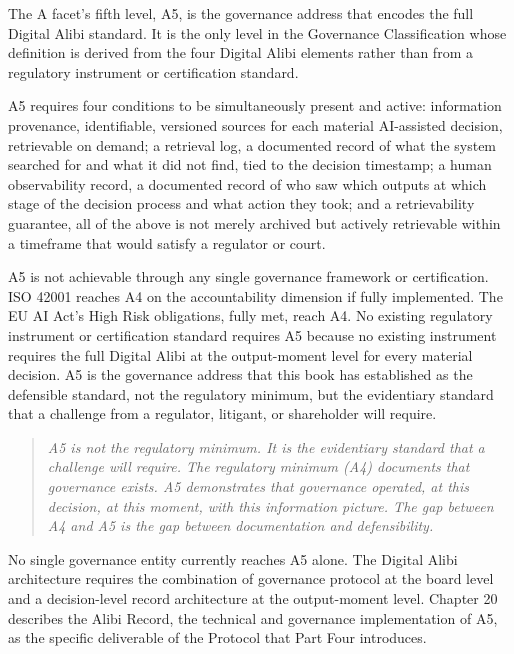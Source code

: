 The A facet's fifth level, A5, is the governance address that encodes the full Digital Alibi standard. It is the only level in the Governance Classification whose definition is derived from the four Digital Alibi elements rather than from a regulatory instrument or certification standard.

A5 requires four conditions to be simultaneously present and active: information provenance, identifiable, versioned sources for each material AI-assisted decision, retrievable on demand; a retrieval log, a documented record of what the system searched for and what it did not find, tied to the decision timestamp; a human observability record, a documented record of who saw which outputs at which stage of the decision process and what action they took; and a retrievability guarantee, all of the above is not merely archived but actively retrievable within a timeframe that would satisfy a regulator or court.

A5 is not achievable through any single governance framework or certification. ISO 42001 reaches A4 on the accountability dimension if fully implemented. The EU AI Act's High Risk obligations, fully met, reach A4. No existing regulatory instrument or certification standard requires A5 because no existing instrument requires the full Digital Alibi at the output-moment level for every material decision. A5 is the governance address that this book has established as the defensible standard, not the regulatory minimum, but the evidentiary standard that a challenge from a regulator, litigant, or shareholder will require.

\begin{quote}
\emph{A5 is not the regulatory minimum. It is the evidentiary standard that a challenge will require. The regulatory minimum (A4) documents that governance exists. A5 demonstrates that governance operated, at this decision, at this moment, with this information picture. The gap between A4 and A5 is the gap between documentation and defensibility.}
\end{quote}

No single governance entity currently reaches A5 alone. The Digital Alibi architecture requires the combination of governance protocol at the board level and a decision-level record architecture at the output-moment level. Chapter 20 describes the Alibi Record, the technical and governance implementation of A5, as the specific deliverable of the Protocol that Part Four introduces.

\scenebreak

